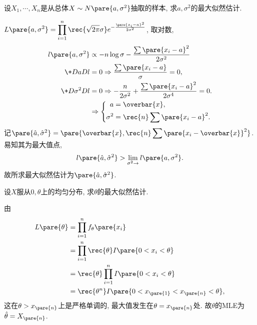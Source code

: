\documentclass[../Statistics.tex]{subfiles}
\begin{document}
\begin{sample}
    \begin{ex}
        设$X_1, \cdots, X_n$是从总体$X\sim N\pare{a,\sigma^2}$抽取的样本, 求$a, \sigma^2$的最大似然估计.
    \end{ex}
    \begin{solution}
        $\displaystyle L\pare{a,\sigma^2} = \prod_{i=1}^n \rec{\sqrt{2\pi}\sigma} e^{-\frac{\pare{x_i-a}^2}{2\sigma^2}}$, 取对数,
        \begin{align*}
            l\pare{a,\sigma^2} &\propto -n\log \sigma - \frac{\sum \pare{x_i - a}^2}{2\sigma^2} \\
            \+DaDl &= 0 \Rightarrow \frac{\sum \pare{x_i - a}}{\sigma} = 0, \\
            \+D{\sigma^2}Dl &= 0 \Rightarrow -\frac{n}{2\sigma^2} + \frac{\sum\pare{x_i - a}^2}{2\sigma^4} = 0. \\
            &\Rightarrow \left\{\begin{aligned}
                a &= \overbar{x}, \\
                \sigma^2 &= \rec{n} \sum\pare{x_i-a}^2.
            \end{aligned}\right.
        \end{align*}
        记$\pare{\hat{a}, \hat{\sigma}^2} = \displaystyle \pare{\overbar{x}, \rec{n} \sum\pare{x_i - \overbar{x}}^2}$. 易知其为最大值点,
        \[ l\pare{\hat{a}, \hat{\sigma}^2} > \lim_{\sigma^2\rightarrow} l\pare{a,\sigma^2}. \]
        故所求最大似然估计为$\pare{\hat{a}, \hat{\sigma}^2}$.
    \end{solution}
\end{sample}
\begin{sample}
    \begin{ex}
        设$X$服从$0,\theta$上的均匀分布, 求$\theta$的最大似然估计.
    \end{ex}
    \begin{solution}
        由
        \begin{align*}
            L\pare{\theta} &= \prod_{i=1}^n f_\theta\pare{x_i} \\
            &= \prod_{i=1}^n \rec{\theta} I\pare{0<x_i<\theta} \\
            &= \rec{\theta} \prod_{i=1}^n I\pare{0<x_i<\theta} \\
            &= \rec{\theta^n} I\pare{0 < x_{\pare{1}} < x_{\pare{n}} < \theta},
        \end{align*}
        这在$\theta>x_{\pare{n}}$上是严格单调的, 最大值发生在$\theta = x_{\pare{n}}$处. 故$\theta$的MLE为$\hat\theta = X_{\pare{n}}$.
    \end{solution}
\end{sample}
\end{document}
